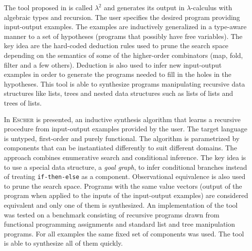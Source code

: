 The tool proposed in \cite{Feser:2015:SDS:2737924.2737977} is called $\lambda^2$ and generates its output in $\lambda$-calculus with algebraic types and recursion.
The user specifies the desired program providing input-output examples.  
The examples are inductively generalized in a type-aware manner to a set of hypotheses (programs that possibly have free variables).
The key idea are the hard-coded deduction rules used to prune the search space depending on the semantics of some of the higher-order combinators (map, fold, filter and a few others).
Deduction is also used to infer new input-output examples in order to generate the programs needed to fill in the holes in the hypotheses.
This tool is able to synthesize programs manipulating recursive data structures like lists, trees and nested data structures such as lists of lists and trees of lists.

In \cite{Albarghouthi:2013:RPS:2526861.2526942} \textsc{Escher} is presented, an inductive synthesis algorithm that learns a recursive procedure from input-output examples provided by the user.  The target language is untyped, first-order and purely functional.
The algorithm is parametrized by components that can be instantiated differently to suit different domains.
The approach combines enumerative search and conditional inference. The key idea is to use a special data structure, a \emph{goal graph}, to infer conditional branches instead of treating \texttt{if-then-else} as a component.
Observational equivalence is also used to prune the search space. Programs with the same value vectors (output of the program when applied to the inputs of the input-output examples) are considered equivalent and only one of them is synthesized.
An implementation of the tool was tested on a benchmark consisting of recursive programs  drawn from functional programming assignments and standard list and tree manipulation programs.
For all examples the same fixed set of components was used.
The tool is able to synthesize all of them quickly. 


